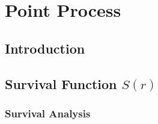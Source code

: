 \section{Point Process}



  \subsection{Introduction}


  
  \subsection{Survival Function $S(r)$}



     \subsubsection{Survival Analysis}


     \subsubsection{}
